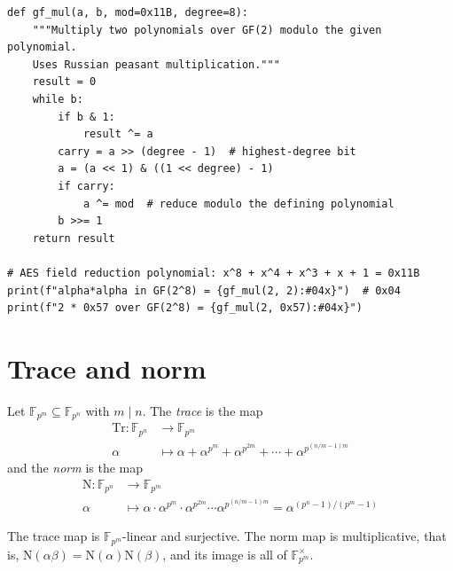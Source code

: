 \documentclass[a4paper, 12pt]{book} %
\begin{document}
\begin{verbatim}
def gf_mul(a, b, mod=0x11B, degree=8):
    """Multiply two polynomials over GF(2) modulo the given polynomial.
    Uses Russian peasant multiplication."""
    result = 0
    while b:
        if b & 1:
            result ^= a
        carry = a >> (degree - 1)  # highest-degree bit
        a = (a << 1) & ((1 << degree) - 1)
        if carry:
            a ^= mod  # reduce modulo the defining polynomial
        b >>= 1
    return result

# AES field reduction polynomial: x^8 + x^4 + x^3 + x + 1 = 0x11B
print(f"alpha*alpha in GF(2^8) = {gf_mul(2, 2):#04x}")  # 0x04
print(f"2 * 0x57 over GF(2^8) = {gf_mul(2, 0x57):#04x}")
\end{verbatim}

\section{Trace and norm}

\begin{definition}
    Let $\mathbb{F}_{p^m} \subseteq \mathbb{F}_{p^n}$ with $m \mid n$. The \emph{trace} is the map
    \begin{align}
        \mathrm{Tr}: \mathbb{F}_{p^n} &\longrightarrow \mathbb{F}_{p^m} \\
        \alpha &\longmapsto \alpha + \alpha^{p^m} + \alpha^{p^{2m}} + \cdots + \alpha^{p^{(n/m - 1)m}}
    \end{align}
    and the \emph{norm} is the map
    \begin{align}
        \mathrm{N}: \mathbb{F}_{p^n} &\longrightarrow \mathbb{F}_{p^m} \\
        \alpha &\longmapsto \alpha \cdot \alpha^{p^m} \cdot \alpha^{p^{2m}} \cdots \alpha^{p^{(n/m-1)m}} = \alpha^{(p^n-1)/(p^m-1)}
    \end{align}
\end{definition}

\begin{proposition}
    The trace map is $\mathbb{F}_{p^m}$-linear and surjective. The norm map is multiplicative, that is, $\mathrm{N}(\alpha\beta) = \mathrm{N}(\alpha)\mathrm{N}(\beta)$, and its image is all of $\mathbb{F}_{p^m}^\times$.
\end{proposition}
\end{document}
